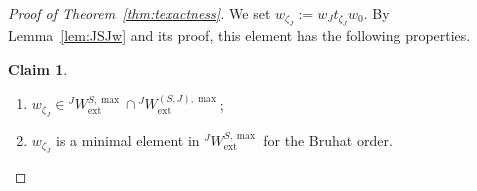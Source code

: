 \documentclass[11pt]{amsart}
\numberwithin{equation}{section}
\theoremstyle{plain}
\theoremstyle{definition}
\newtheorem{claim}[thm]{Claim}
\newcommand{\ex}{\mathrm{ext}}
\begin{document}
\begin{proof}[Proof of Theorem~\ref{thm:texactness}]
We set $w_{\zeta_J}:=w_Jt_{\zeta_J}w_0$. By 
Lemma~\ref{lem:JSJw} and its proof,
this element has the following properties.

\begin{claim}
\label{cl:properties-w-zetaJ}
\begin{enumerate}
\item 
\label{it:w-zetaJ-1}
$w_{\zeta_J}\in {}^JW_\ex^{S,\max} \cap {}^JW_\ex^{(S,J),\max}$; 
\item 
\label{it:w-zetaJ-3}
$w_{\zeta_J}$ is a minimal element in ${}^JW_\ex^{S,\max}$ for the Bruhat order.
\end{enumerate}
\end{claim}



\end{proof}
\end{document}

